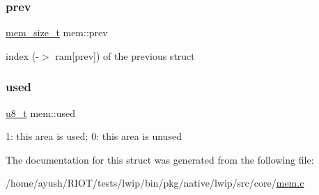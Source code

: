 \subsubsection{\texorpdfstring{prev}{prev}}
{\footnotesize\ttfamily \hyperlink{native_2lwip_2src_2include_2lwip_2mem_8h_a49bff6e5dd4cb95fe6dc0670962bbf54}{mem\+\_\+size\+\_\+t} mem\+::prev}

index (-\/$>$ ram\mbox{[}prev\mbox{]}) of the previous struct \mbox{\label{structmem_aa76b6a39425617435978dce903f0d456}} 
\subsubsection{\texorpdfstring{used}{used}}
{\footnotesize\ttfamily \hyperlink{group__compiler__abstraction_ga4caecabca98b43919dd11be1c0d4cd8e}{u8\+\_\+t} mem\+::used}

1\+: this area is used; 0\+: this area is unused 

The documentation for this struct was generated from the following file\+:\begin{DoxyCompactItemize}
\item 
/home/ayush/\+R\+I\+O\+T/tests/lwip/bin/pkg/native/lwip/src/core/\hyperlink{native_2lwip_2src_2core_2mem_8c}{mem.\+c}\end{DoxyCompactItemize}
